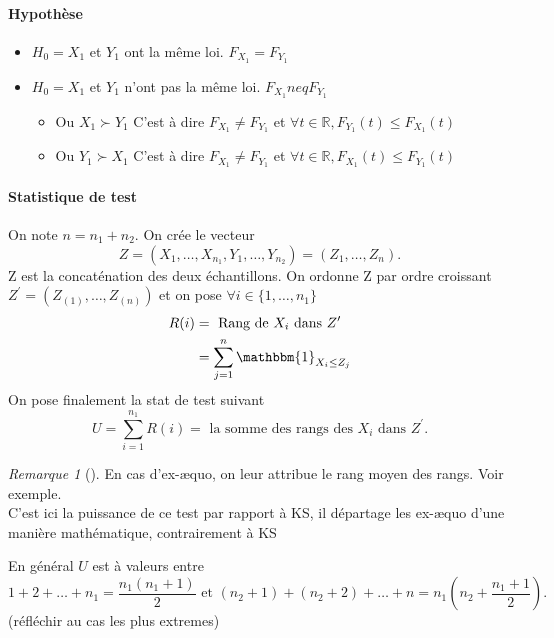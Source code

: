 \documentclass{article}
\theoremstyle{plain}%
\theoremstyle{definition}
\theoremstyle{remark}
\newtheorem*{rem}{Remarque}
\begin{document}
\paragraph*{Hypothèse}
\begin{itemize}
    \item $ H_0 = X_1 $ et $ Y_1 $ ont la même loi. $ F_{X_1} = F_{Y_1} $ 
    \item $ H_0 = X_1 $ et $ Y_1 $ n'ont pas la même loi. $ F_{X_1} neq F_{Y_1} $ \begin{itemize}
        \item Ou $ X_1 \succ Y_1 $ C'est à dire $ F_{X_1} \neq F_{Y_1} $ et $ \forall t \in \mathbb{R}, F_{Y_1}(t) \leq F_{X_1}(t) $ 
        \item Ou $ Y_1 \succ X_1 $ C'est à dire $ F_{X_1} \neq F_{Y_1} $ et $ \forall t \in \mathbb{R}, F_{X_1}(t) \leq F_{Y_1}(t) $ 
    \end{itemize}
\end{itemize}

\paragraph*{Statistique de test}
On note $ n = n_1 + n_2 $. On crée le vecteur 
\[
    Z = (X_1, \dots, X_{n_1}, Y_1, \dots, Y_{n_2}) = (Z_1, \dots, Z_n)
.\]
Z est la concaténation des deux échantillons. On ordonne Z par ordre croissant $ Z^\prime = (Z_{(1)}, \dots, Z_{(n)}) $ et on pose $ \forall i \in \{1,\dots, n_1\} $ 
\begin{align*}
    R(i) &= \text{ Rang de } X_i \text{ dans } Z^\prime  \\
        &= \sum_{j=1}^{n}\mathbbm{1}_{X_i \leq Z_j}
\end{align*}
On pose finalement la stat de test suivant
\[
    U = \sum_{i=1}^{n_1}R(i) = \text{ la somme des rangs des } X_i \text{ dans } Z^\prime 
.\]
\begin{rem}[]
    En cas d'ex-æquo, on leur attribue le rang moyen des rangs. Voir exemple. \\
    C'est ici la puissance de ce test par rapport à KS, il départage les ex-æquo d'une manière mathématique, contrairement à KS
\end{rem}

En général $ U $ est à valeurs entre 
\[
    1 + 2 + \dots + n_1 = \frac{n_1 (n_1 + 1)}{2} \text{ et } (n_2+1) + (n_2 + 2) + \dots + n = n_1(n_2 + \frac{n_1 + 1}{2})
.\]
(réfléchir au cas les plus extremes)
\end{document}
